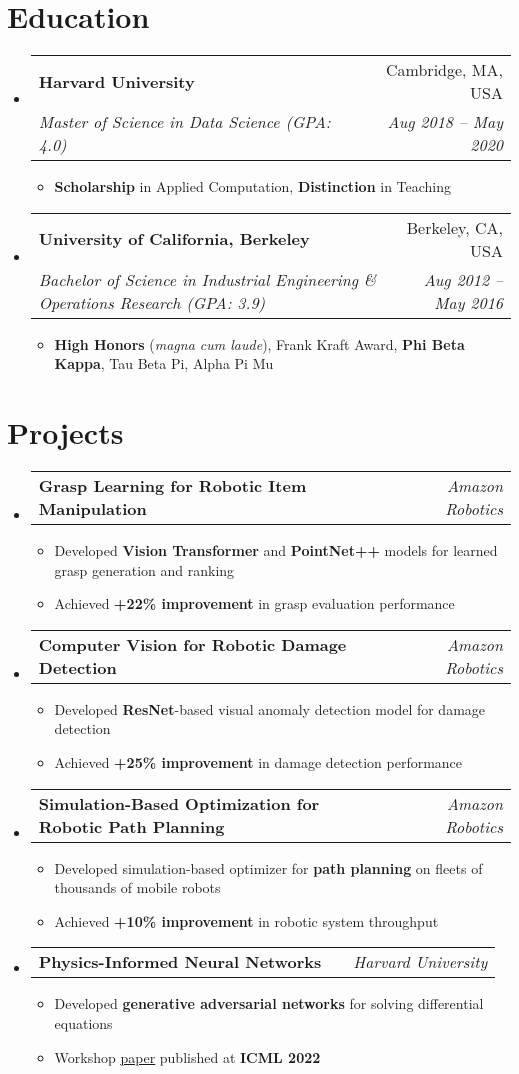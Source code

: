 \documentclass[a4paper,11pt]{article}
\makeatletter
\newcommand{\resumeItem}[1]{
  \item\small{#1}
}
\newcommand{\resumeItemListStart}{\begin{itemize}[rightmargin=0.11in]}
\newcommand{\resumeItemListEnd}{\end{itemize}}
\newcommand{\resumeTrioHeading}[3]{
  \item\small{
    \begin{tabular*}{0.96\textwidth}[t]{
      l@{\extracolsep{\fill}}c@{\extracolsep{\fill}}r
    }
      \textbf{#1} & \textit{#2} & #3
    \end{tabular*}
  }
}
\newcommand{\resumeQuadHeading}[4]{
  \item
  \begin{tabular*}{0.96\textwidth}[t]{l@{\extracolsep{\fill}}r}
    \textbf{#1} & #2 \\
    \textit{\small#3} & \textit{\small #4} \\
  \end{tabular*}
}
\newcommand{\resumeHeadingListStart}{
  \begin{itemize}[leftmargin=0.15in, label={}]
}
\newcommand{\resumeHeadingListEnd}{\end{itemize}}
\makeatother
\begin{document}

\section{Education}
  \resumeHeadingListStart{}
    \resumeQuadHeading{Harvard University}{Cambridge, MA, USA}
    {Master of Science in Data Science (GPA: 4.0)}{Aug 2018 -- May 2020}
    \resumeItemListStart{}
      \resumeItem{\textbf{Scholarship} in Applied Computation, \textbf{Distinction} in Teaching}
    \resumeItemListEnd{}
    \resumeQuadHeading{University of California, Berkeley}{Berkeley, CA, USA}
    {Bachelor of Science in Industrial Engineering \& Operations Research (GPA: 3.9)}{Aug 2012 -- May 2016}
    \resumeItemListStart{}
      \resumeItem{\textbf{High Honors} (\textit{magna cum laude}), Frank Kraft Award, \textbf{Phi Beta Kappa}, Tau Beta Pi, Alpha Pi Mu}
    \resumeItemListEnd{}
  \resumeHeadingListEnd{}



\section{Projects}
  \resumeHeadingListStart{}
    \resumeTrioHeading{Grasp Learning for Robotic Item Manipulation}{}{\emph{Amazon Robotics}}
      \resumeItemListStart{}
        \resumeItem{Developed \textbf{Vision Transformer} and \textbf{PointNet++} models for learned grasp generation and ranking}
        \resumeItem{Achieved \textbf{+22\% improvement} in grasp evaluation performance}
      \resumeItemListEnd{}

    \resumeTrioHeading{Computer Vision for Robotic Damage Detection}{}{\emph{Amazon Robotics}}
        \resumeItemListStart{}
            \resumeItem{Developed \textbf{ResNet}-based visual anomaly detection model for damage detection}
            \resumeItem{Achieved \textbf{+25\% improvement} in damage detection performance}
        \resumeItemListEnd{}
    \resumeTrioHeading{Simulation-Based Optimization for Robotic Path Planning}{}{\emph{Amazon Robotics}}
        \resumeItemListStart{}
            \resumeItem{Developed simulation-based optimizer for \textbf{path planning} on fleets of thousands of mobile robots}
            \resumeItem{Achieved \textbf{+10\% improvement} in robotic system throughput}
        \resumeItemListEnd{}
    \resumeTrioHeading{Physics-Informed Neural Networks}{}{\emph{Harvard University}}
      \resumeItemListStart{}
        \resumeItem{Developed \textbf{generative adversarial networks} for solving differential equations}
        \resumeItem{Workshop \href{https://github.com/dylanrandle/denn}{\uline{paper}} published at \textbf{ICML 2022}}
      \resumeItemListEnd{}
  \resumeHeadingListEnd{}
\end{document}
